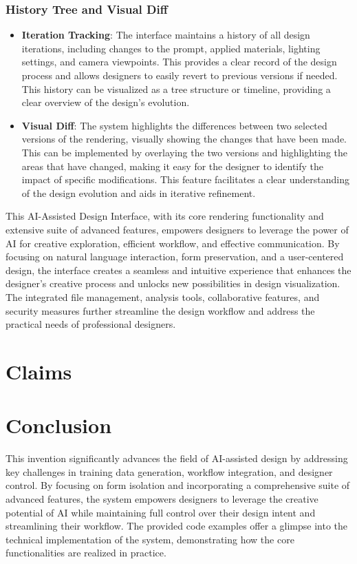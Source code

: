 \documentclass{article}
\begin{document}
\subsubsection{History Tree and Visual Diff}
\begin{itemize}
\item \textbf{Iteration Tracking}: The interface maintains a history of all design iterations, including changes to the prompt, applied materials, lighting settings, and camera viewpoints. This provides a clear record of the design process and allows designers to easily revert to previous versions if needed. This history can be visualized as a tree structure or timeline, providing a clear overview of the design's evolution.
\item \textbf{Visual Diff}: The system highlights the differences between two selected versions of the rendering, visually showing the changes that have been made. This can be implemented by overlaying the two versions and highlighting the areas that have changed, making it easy for the designer to identify the impact of specific modifications. This feature facilitates a clear understanding of the design evolution and aids in iterative refinement.
\end{itemize}

This AI-Assisted Design Interface, with its core rendering functionality and extensive suite of advanced features, empowers designers to leverage the power of AI for creative exploration, efficient workflow, and effective communication. By focusing on natural language interaction, form preservation, and a user-centered design, the interface creates a seamless and intuitive experience that enhances the designer's creative process and unlocks new possibilities in design visualization. The integrated file management, analysis tools, collaborative features, and security measures further streamline the design workflow and address the practical needs of professional designers.

\section{Claims}

\section{Conclusion}

This invention significantly advances the field of AI-assisted design by addressing key challenges in training data generation, workflow integration, and designer control. By focusing on form isolation and incorporating a comprehensive suite of advanced features, the system empowers designers to leverage the creative potential of AI while maintaining full control over their design intent and streamlining their workflow. The provided code examples offer a glimpse into the technical implementation of the system, demonstrating how the core functionalities are realized in practice. 
\end{document}
